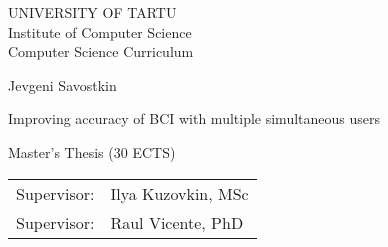 \documentclass[12pt]{article}
\begin{document}
\thispagestyle{empty}
\begin{center}

\large
UNIVERSITY OF TARTU\\[2mm]
Institute of Computer Science\\
Computer Science Curriculum\\[2mm]

\vspace{25mm}

\Large Jevgeni Savostkin

\vspace{4mm}

\huge Improving accuracy of BCI with multiple simultaneous users

\vspace{20mm}

\Large Master's Thesis (30 ECTS)

\end{center}

\vspace{2mm}

\begin{flushright}
 {
 \setlength{\extrarowheight}{5pt}
 \begin{tabular}{r l} 
  \sffamily Supervisor: & \sffamily Ilya Kuzovkin, MSc \\ 
  \sffamily Supervisor: & \sffamily Raul Vicente, PhD 
 \end{tabular}
 }
\end{flushright}

\vspace{10mm}

\vspace{2mm}



\vspace{2mm}


\vspace{8mm}
\end{document}
